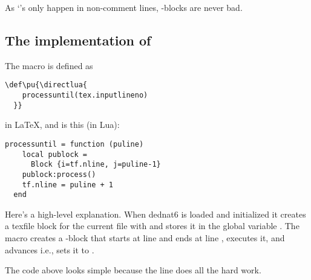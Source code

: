 \documentclass{ltugboat}
\begin{document}
As `\co{\\pu}'s only happen in non-comment lines, \co{\\pu}-blocks are
never bad.



%
\subsection{The implementation of \co{\\pu}}

The macro \co{\\pu} is defined as 
%
\begin{verbatim}
\def\pu{\directlua{
    processuntil(tex.inputlineno)
  }}
\end{verbatim}
%
in \LaTeX, and  is this (in Lua):
%
\begin{verbatim}
processuntil = function (puline)
    local publock =
      Block {i=tf.nline, j=puline-1}
    publock:process()
    tf.nline = puline + 1
  end
\end{verbatim}

Here's a high-level explanation. When dednat6 is loaded and
initialized it creates a texfile block for the current  file \Dash
with  \Dash and stores it in the global variable .
The macro \co{\\pu} creates a \co{\\pu}-block that starts at line
 and ends at line , executes it,
and advances  \Dash i.e., sets it to
.


The code above looks simple because the line 
does all the hard work.




%
\end{document}
